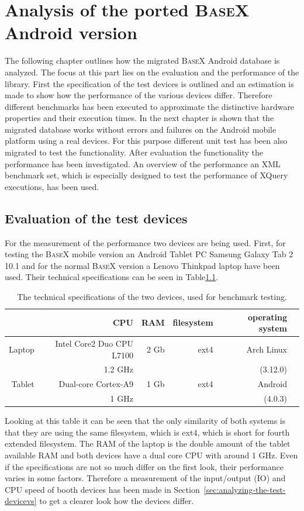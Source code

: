 \chapter{Analysis of the ported \textsc{BaseX} Android version}
\label{cha:analysis}
The following chapter outlines how the migrated \textsc{BaseX} Android database is analyzed.
The focus at this part lies on the evaluation and the performance of the library.
First the specification of the test devices is outlined and an estimation is made to show how the performance of the various devices differ.
Therefore different benchmarks has been executed to approximate the distinctive hardware properties and their execution times.
In the next chapter is shown that the migrated database works without errors and failures on the Android mobile platform using a real devices.
For this purpose different unit test has been also migrated to test the functionality.
After evaluation the functionality the performance has been investigated.
An overview of the performance an XML benchmark set, which is especially designed to test the performance of XQuery executions, has been used.
\section{Evaluation of the test devices}
\label{sec:evaluation-of-the-test-devices}
For the measurement of the performance two devices are being used.
First, for testing the \textsc{BaseX} mobile version an Android Tablet PC Samsung Galaxy Tab 2 10.1 and for the normal \textsc{BaseX} version a Lenovo Thinkpad laptop have been used.
Their technical specifications can be seen in Table\ref{tab:test-dev-specs}.
\begin {table}[htpb] 
  \centering
\begin {tabular} {|r|r|r|r|r|r|}
  	\hline
	&CPU&RAM&filesystem&operating system\\
	\hline
	Laptop&Intel Core2 Duo CPU L7100&2 Gb&ext4&Arch Linux\\
	&1.2 GHz&&&(3.12.0)\\
	\hline
	Tablet&Dual-core Cortex-A9&1 Gb&ext4&Android\\
	&1 GHz&&&(4.0.3)\\
	\hline
\end {tabular}
\caption {The technical specifications of the two devices, used for benchmark testing.}
\label {tab:test-dev-specs}
\end {table}

Looking at this table it can be seen that the only similarity of both systems is that they are using the same filesystem, which is ext4, which is short for fourth extended filesystem.
The RAM of the laptop is the double amount of the tablet available RAM and both devices have a dual core CPU with around 1 GHz.
Even if the specifications are not so much differ on the first look, their performance varies in some factors.
Therefore a measurement of the input/output (IO) and CPU speed of booth devices has been made in Section~\ref{sec:analyzing-the-test-devicevs} to get a clearer look how the devices differ.


